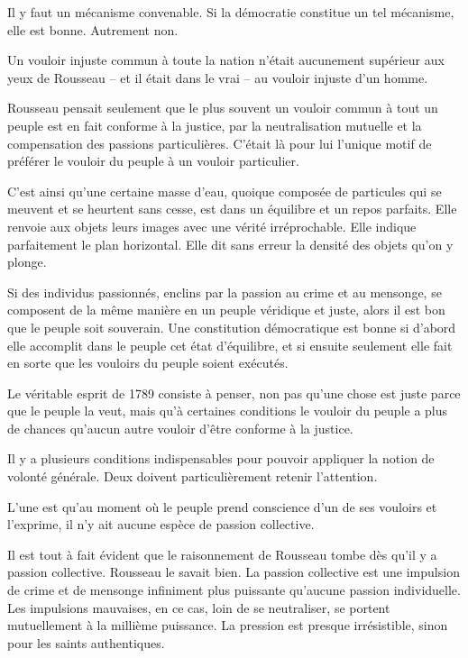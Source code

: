 \documentclass[french,twoside]{book} %
\begin{document}
Il y faut un mécanisme convenable. Si la démocratie constitue un tel mécanisme, elle est bonne. Autrement non.\par
Un vouloir injuste commun à toute la nation n’était aucunement supérieur aux yeux de Rousseau – et il était dans le vrai – au vouloir injuste d’un homme.\par
Rousseau pensait seulement que le plus souvent un vouloir commun à tout un peuple est en fait conforme à la justice, par la neutralisation mutuelle et la compensation des passions particulières. C’était là pour lui l’unique motif de préférer le vouloir du peuple à un vouloir particulier.\par
C’est ainsi qu’une certaine masse d’eau, quoique composée de particules qui se meuvent et se heurtent sans cesse, est dans un équilibre et un repos parfaits. Elle renvoie aux objets leurs images avec une vérité irréprochable. Elle indique parfaitement le plan horizontal. Elle dit sans erreur la densité des objets qu’on y plonge.\par
Si des individus passionnés, enclins par la passion au crime et au mensonge, se composent de la même manière en un peuple véridique et juste, alors il est bon que le peuple soit souverain. Une constitution démocratique est bonne si d’abord elle accomplit dans le peuple cet état d’équilibre, et si ensuite seulement elle fait en sorte que les vouloirs du peuple soient exécutés.\par
Le véritable esprit de 1789 consiste à penser, non pas qu’une chose est juste parce que le peuple la veut, mais qu’à certaines conditions le vouloir du peuple a plus de chances qu’aucun autre vouloir d’être conforme à la justice.\par
Il y a plusieurs conditions indispensables pour pouvoir appliquer la notion de volonté générale. Deux doivent particulièrement retenir l’attention.\par
L’une est qu’au moment où le peuple prend conscience d’un de ses vouloirs et l’exprime, il n’y ait aucune espèce de passion collective.\par
Il est tout à fait évident que le raisonnement de Rousseau tombe dès qu’il y a passion collective. Rousseau le savait bien. La passion collective est une impulsion de crime et de mensonge infiniment plus puissante qu’aucune passion individuelle. Les impulsions mauvaises, en ce cas, loin de se neutraliser, se portent mutuellement à la millième puissance. La pression est presque irrésistible, sinon pour les saints authentiques.\par
\end{document}
